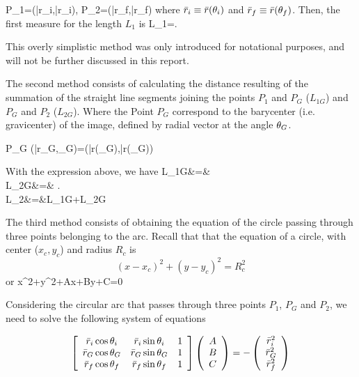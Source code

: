\beq
P_1=(\bar{r}_i,\bar{r}_{i}), \quad
P_2=(\bar{r}_f,\bar{r}_{f})
\eeq
where $\bar{r}_i\equiv \bar{r}(\theta_i)$ and $\bar{r}_f\equiv \bar{r}(\theta_f)$.
Then, the first measure for the length $L_1$ is
\beq
L_1=.
\label{first_length_def}
\eeq

This overly simplistic method was only introduced for notational
purposes, and will not be further discussed in this report.

The second method consists of calculating the distance resulting of
the summation of the straight line segments joining the points $P_1$
and $P_G$ ($L_{1G}$) and $P_G$ and $P_2$ ($L_{2G}$). Where the Point
$P_G$ correspond to the barycenter (i.e. gravicenter) of the image,
defined by radial vector at the angle $\theta_G$.

\beq
P_G\equiv
(\bar{r}_G,\te_G)=(\bar{r}(\te_G),\bar{r}(\te_G))
\eeq

With the expression above, we have
\bea
L_{1G}&=&\\ 
L_{2G}&=&
.\\
L_2&=&L_{1G}+L_{2G}
\eea

The third method consists of obtaining the equation of the circle
passing through three points belonging to the arc. Recall that that
the equation of a circle, with center ($x_{c},y_{c}$) and radius $R_c$
is
\begin{equation*}
 (x-x_c)^2+(y-y_c)^2=R^2_c
\end{equation*}
or
\beq
x^2+y^2+Ax+By+C=0\\
\eeq 

Considering the circular arc that passes through three points $P_1$, $P_G$ and
$P_2$, we need to solve the following system of equations


\begin{equation}
 \left[\begin{array}{c c c}
        \bar{r}_i\cos{\theta_i} & \bar{r}_i\sin{\theta_i} & 1\\
	\bar{r}_G\cos{\theta_G} & \bar{r}_G\sin{\theta_G} & 1\\
	\bar{r}_f\cos{\theta_f} & \bar{r}_f\sin{\theta_f} & 1\\
\end{array} \right]\left(\begin{array}{c} A \\ B\\ C
\end{array}\right)=-\left(\begin{array}{c}                         
\bar{r}^2_i\\ \bar{r}^2_G\\ \bar{r}^2_f\end{array}  \right) 
\end{equation}

